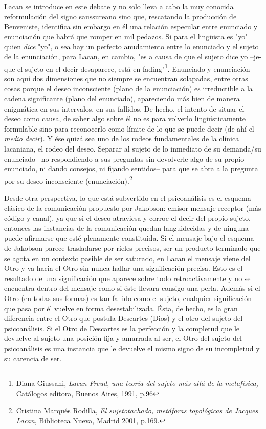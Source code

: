 Lacan se introduce en este debate y no solo lleva a cabo la muy conocida
reformulación del signo saussureano sino que, rescatando la producción
de Benveniste, identifica sin embargo en él una relación especular entre
enunciado y enunciación que habrá que romper en mil pedazos. Si para el
lingüista es "yo" quien \emph{dice} "yo", o sea hay un perfecto
anudamiento entre lo enunciado y el sujeto de la enunciación, para
Lacan, en cambio, "es a causa de que el sujeto dice yo --je- que el
sujeto en el decir desaparece, está en fading"\footnote{Diana Giussani,
  \emph{Lacan-Freud}, \emph{una teoría del sujeto más allá de la
  metafísica,} Catálogos editora, Buenos Aires, 1991, p.96}. Enunciado y
enunciación son aquí dos dimensiones que no siempre se encuentran
solapadas, entre otras cosas porque el deseo inconsciente (plano de la
enunciación) es irreductible a la cadena significante (plano del
enunciado), apareciendo más bien de manera enigmática en sus intervalos,
en sus fallidos. De hecho, el intento de situar el deseo como causa, de
saber algo sobre él no es para volverlo lingüísticamente formulable sino
para reconocerlo como límite de lo que se puede decir (de ahí el
\emph{medio decir}). Y ése quizá sea uno de los rodeos fundamentales de
la clínica lacaniana, el rodeo del deseo. Separar al sujeto de lo
inmediato de su demanda/su enunciado --no respondiendo a sus preguntas
sin devolverle algo de su propio enunciado, ni dando consejos, ni
fijando sentidos-- para que se abra a la pregunta por su deseo
inconsciente (enunciación).\footnote{Cristina Marqués Rodilla, \emph{El
  sujetotachado, metáforas topológicas de Jacques Lacan}, Biblioteca
  Nueva, Madrid 2001, p.169.}

Desde otra perspectiva, lo que está subvertido en el psicoanálisis es el
esquema clásico de la comunicación propuesto por Jakobson:
emisor-mensaje-receptor (más código y canal), ya que si el deseo
atraviesa y corroe el decir del propio sujeto, entonces las instancias
de la comunicación quedan languidecidas y de ninguna puede afirmarse que
esté plenamente constituida. Si el mensaje bajo el esquema de Jakobson
parece trasladarse por rieles precisos, ser un producto terminado que se
agota en un contexto pasible de ser saturado, en Lacan el mensaje viene
del Otro y va hacia el Otro sin nunca hallar una significación precisa.
Esto es el resultado de una significación que aparece sobre todo
retroactivamente y no se encuentra dentro del mensaje como si éste
llevara consigo una perla. Además si el Otro (en todas sus formas) es
tan fallido como el sujeto, cualquier significación que pasa por él
vuelve en forma desestabilizada. Ésta, de hecho, es la gran diferencia
entre el Otro que postula Descartes (Dios) y el otro del sujeto del
psicoanálisis. Si el Otro de Descartes es la perfección y la completud
que le devuelve al sujeto una posición fija y amarrada al ser, el Otro
del sujeto del psicoanálisis es una instancia que le devuelve el mismo
signo de su incompletud y su carencia de ser.

